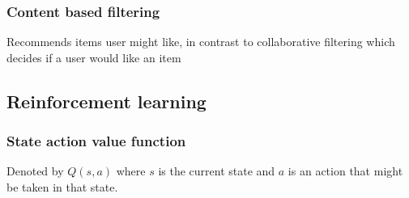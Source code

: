 \documentclass[12pt]{article}
\begin{document}
\subsubsection{Content based filtering}

Recommends items user might like, in contrast to collaborative filtering which decides if a user
would like an item

\subsection{Reinforcement learning}

\subsubsection{State action value function}

Denoted by $Q(s,a)$ where $s$ is the current state and $a$ is an action that might
be taken in that state.
\end{document}
